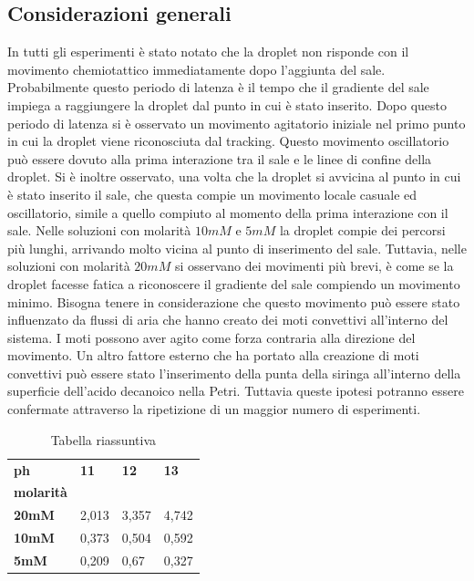 \subsection{Considerazioni generali}
In tutti gli esperimenti è stato notato che la droplet non risponde con il movimento chemiotattico immediatamente dopo l'aggiunta del sale. Probabilmente questo periodo di latenza è il tempo che il gradiente del sale impiega a raggiungere la droplet dal punto in cui è stato inserito.
Dopo questo periodo di latenza si è osservato un movimento agitatorio iniziale nel primo punto in cui la droplet viene riconosciuta dal tracking. Questo movimento oscillatorio può essere dovuto alla prima interazione tra il sale e le linee di confine della droplet.
Si è inoltre osservato, una volta che la droplet si avvicina al punto in cui è stato inserito il sale, che questa compie un movimento locale casuale ed oscillatorio, simile a quello compiuto al momento della prima interazione con il sale.
Nelle soluzioni con molarità $10mM$ e $5mM$ la droplet compie dei percorsi più lunghi, arrivando molto vicina al punto di inserimento del sale.  Tuttavia, nelle soluzioni con molarità $20mM$ si osservano dei movimenti più brevi, è come se la droplet facesse fatica a riconoscere il gradiente del sale compiendo un movimento minimo. Bisogna tenere in considerazione che questo movimento può essere stato influenzato da flussi di aria che hanno creato dei moti convettivi all'interno del sistema. I moti possono aver agito come forza contraria alla direzione del movimento. Un altro fattore esterno che ha portato alla creazione di moti convettivi può essere stato l'inserimento della punta della siringa all'interno della superficie dell'acido decanoico nella Petri. Tuttavia queste ipotesi potranno essere confermate attraverso la ripetizione di un maggior numero di esperimenti.
\begin{table}[h]
\caption{Tabella riassuntiva}
\begin{center}
\begin{tabular}{llll}
\textbf{ph}                       & \textbf{11}                         & \textbf{12}    & \textbf{13}    \\
\textbf{molarità}                 &                            &       &       \\
\textbf{20mM}                     & 2,013                      & 3,357 & 4,742 \\
\textbf{10mM}                     & 0,373                      & 0,504 & 0,592 \\ \cline{2-2}
\multicolumn{1}{l|}{\textbf{5mM}} & \multicolumn{1}{l|}{0,209} & 0,67  & 0,327 \\ \cline{2-2}
\end{tabular}
\end{center}
\end{table}
